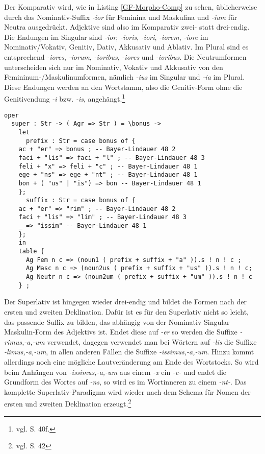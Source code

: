 Der Komparativ wird, wie in Listing \ref{GF-Morpho-Comp} zu sehen, üblicherweise durch das No\-mi\-na\-tiv-Suffix \textit{-ior} für Feminina und Maskulina und \textit{-ium} für Neutra ausgedrückt. Adjektive sind also im Komparativ zwei- statt drei-endig. Die Endungen im Singular sind \textit{-ior}, \textit{-ioris}, \textit{-iori}, \textit{-iorem}, \textit{-iore} im Nominativ/Vokativ, Genitiv, Dativ, Akkusativ und Ablativ. Im Plural sind es entsprechend \textit{-iores}, \textit{-iorum}, \textit{-ioribus}, \textit{-iores} und \textit{-ioribus}. Die Neutrumformen unterscheiden sich nur im Nominativ, Vokativ und Akkusativ von den Femininum-/Maskulinumformen, nämlich \textit{-ius} im Singular und \textit{-ia} im Plural. Diese Endungen werden an den Wortstamm, also die Genitiv-Form ohne die Genitivendung \textit{-i} bzw. \textit{-is}, angehängt.\footnote{vgl. \cite{BAYER-LINDAUER1994} S. 40f.} \par
\begin{lstlisting}[float=h!tp,caption={Erzeugung der Superlativ-Formen eines Adjektivs (vgl. \textbf{MorphoLat.gf})},label={GF-Morpho-Comp},basicstyle=\small]
oper
  super : Str -> ( Agr => Str ) = \bonus ->
    let
      prefix : Str = case bonus of {
	ac + "er" => bonus ; -- Bayer-Lindauer 48 2
	faci + "lis" => faci + "l" ; -- Bayer-Lindauer 48 3
	feli + "x" => feli + "c" ; -- Bayer-Lindauer 48 1
	ege + "ns" => ege + "nt" ; -- Bayer-Lindauer 48 1
	bon + ( "us" | "is") => bon -- Bayer-Lindauer 48 1
	};
      suffix : Str = case bonus of {
	ac + "er" => "rim" ; -- Bayer-Lindauer 48 2
	faci + "lis" => "lim" ; -- Bayer-Lindauer 48 3
	_ => "issim" -- Bayer-Lindauer 48 1
	};
    in
    table {
      Ag Fem n c => (noun1 ( prefix + suffix + "a" )).s ! n ! c ;
      Ag Masc n c => (noun2us ( prefix + suffix + "us" )).s ! n ! c;
      Ag Neutr n c => (noun2um ( prefix + suffix + "um" )).s ! n ! c
    } ;
\end{lstlisting}
Der Superlativ ist hingegen wieder drei-endig und bildet die Formen nach der ersten und zweiten Deklination. Dafür ist es für den Superlativ nicht so leicht, das passende Suffix zu bilden, das abhängig von der Nominativ Singular Maskulin-Form des Adjektivs ist. Endet diese auf \textit{-er} so werden die Suffixe \textit{-rimus,-a,-um} verwendet, dagegen verwendet man bei Wörtern auf \textit{-lis} die Suffixe \textit{-limus,-a,-um}, in allen anderen Fällen die Suffixe \textit{-issimus,-a,-um}. Hinzu kommt allerdings noch eine mögliche Lautveränderung am Ende des Wortstocks. So wird beim Anhängen von \textit{-issimus,-a,-um} aus einem \textit{-x} ein \textit{-c-} und endet die Grundform des Wortes auf \textit{-ns}, so wird es im Wortinneren zu einem \textit{-nt-}. Das komplette Superlativ-Paradigma wird wieder nach dem Schema für Nomen der ersten und zweiten Deklination erzeugt.\footnote{vgl. \cite{BAYER-LINDAUER1994} S. 42} \par
